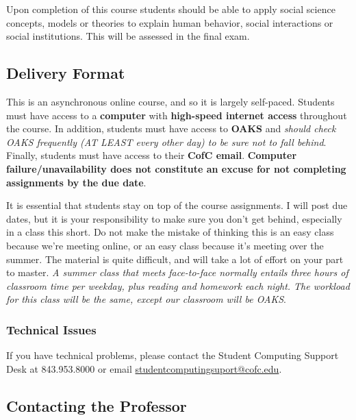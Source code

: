 Upon completion of this course students should be able to apply social
science concepts, models or theories to explain human behavior, social
interactions or social institutions. This will be assessed in the final
exam.

\hypertarget{delivery-format}{%
\subsection{Delivery Format}\label{delivery-format}}

This is an asynchronous online course, and so it is largely self-paced.
Students must have access to a \textbf{computer} with \textbf{high-speed
internet access} throughout the course. In addition, students must have
access to \textbf{OAKS} and \emph{should check OAKS frequently (AT LEAST
every other day) to be sure not to fall behind}. Finally, students must
have access to their \textbf{CofC email}. \textbf{Computer
failure/unavailability does not constitute an excuse for not completing
assignments by the due date}.

\vspace{0.1in}

\noindent It is essential that students stay on top of the course
assignments. I will post due dates, but it is your responsibility to
make sure you don't get behind, especially in a class this short. Do not
make the mistake of thinking this is an easy class because we're meeting
online, or an easy class because it's meeting over the summer. The
material is quite difficult, and will take a lot of effort on your part
to master. \emph{A summer class that meets face-to-face normally entails
three hours of classroom time per weekday, plus reading and homework
each night. The workload for this class will be the same, except our
classroom will be OAKS}.

\hypertarget{technical-issues}{%
\subsubsection{Technical Issues}\label{technical-issues}}

If you have technical problems, please contact the Student Computing
Support Desk at 843.953.8000 or email
\url{studentcomputingsuport@cofc.edu}.

\hypertarget{contacting-the-professor}{%
\subsection{Contacting the Professor}\label{contacting-the-professor}}

